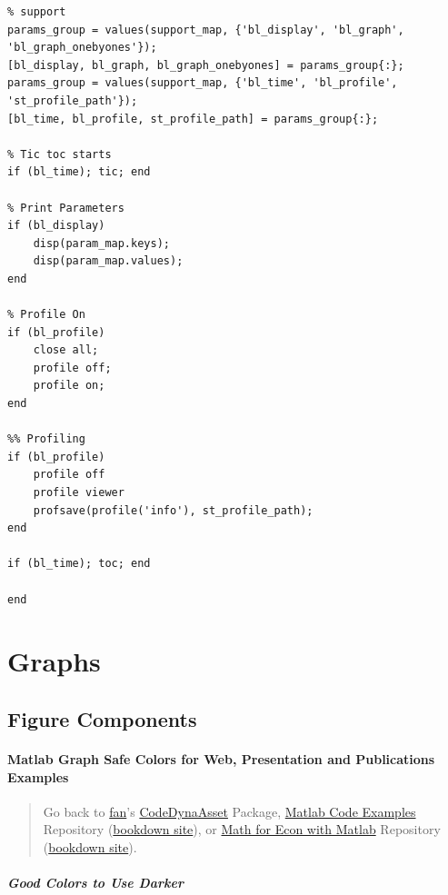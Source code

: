 \documentclass[
]{book}
\begin{document}
\begin{verbatim}
% support
params_group = values(support_map, {'bl_display', 'bl_graph', 'bl_graph_onebyones'});
[bl_display, bl_graph, bl_graph_onebyones] = params_group{:};
params_group = values(support_map, {'bl_time', 'bl_profile', 'st_profile_path'});
[bl_time, bl_profile, st_profile_path] = params_group{:};

% Tic toc starts
if (bl_time); tic; end

% Print Parameters
if (bl_display)
    disp(param_map.keys);
    disp(param_map.values);
end

% Profile On
if (bl_profile)
    close all;
    profile off;
    profile on;
end

%% Profiling
if (bl_profile)
    profile off
    profile viewer
    profsave(profile('info'), st_profile_path);
end

if (bl_time); toc; end

end
\end{verbatim}

\hypertarget{graphs}{%
\chapter{Graphs}\label{graphs}}

\hypertarget{figure-components}{%
\section{Figure Components}\label{figure-components}}

\hypertarget{matlab-graph-safe-colors-for-web-presentation-and-publications-examples}{%
\subsubsection{Matlab Graph Safe Colors for Web, Presentation and Publications Examples}\label{matlab-graph-safe-colors-for-web-presentation-and-publications-examples}}

\begin{quote}
Go back to \href{http://fanwangecon.github.io/}{fan}'s \href{https://fanwangecon.github.io/CodeDynaAsset/}{CodeDynaAsset} Package, \href{https://fanwangecon.github.io/M4Econ/}{Matlab Code Examples} Repository (\href{https://fanwangecon.github.io/M4Econ/bookdown}{bookdown site}), or \href{https://fanwangecon.github.io/Math4Econ/}{Math for Econ with Matlab} Repository (\href{https://fanwangecon.github.io/Math4Econ/bookdown}{bookdown site}).
\end{quote}

\hypertarget{good-colors-to-use-darker}{%
\paragraph{Good Colors to Use Darker}\label{good-colors-to-use-darker}}
\end{document}
